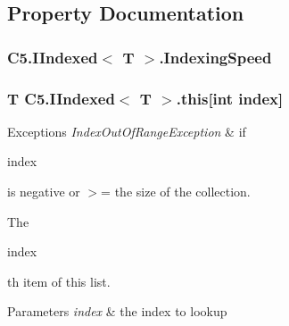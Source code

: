 \subsection{Property Documentation}
\hypertarget{interface_c5_1_1_i_indexed_a32f84a737f8725bc93ff50b44539a413}{}
\subsubsection[{Indexing\+Speed}]{ {\bf C5.\+I\+Indexed}$<$ T $>$.Indexing\+Speed\hspace{0.3cm}{\ttfamily [get]}}\label{interface_c5_1_1_i_indexed_a32f84a737f8725bc93ff50b44539a413}




\hypertarget{interface_c5_1_1_i_indexed_a1e716eed0c1bc5b1d30e456fab869dc6}{}
\subsubsection[{this[int index]}]{\setlength{\rightskip}{0pt plus 5cm}T {\bf C5.\+I\+Indexed}$<$ T $>$.this\mbox{[}int index\mbox{]}\hspace{0.3cm}{\ttfamily [get]}}\label{interface_c5_1_1_i_indexed_a1e716eed0c1bc5b1d30e456fab869dc6}





\begin{DoxyExceptions}{Exceptions}
{\em Index\+Out\+Of\+Range\+Exception} & if 
\begin{DoxyCode}
index
\end{DoxyCode}
 is negative or $>$= the size of the collection.\\
\hline
\end{DoxyExceptions}


The 
\begin{DoxyCode}
index
\end{DoxyCode}
\textquotesingle{}th item of this list.


\begin{DoxyParams}{Parameters}
{\em index} & the index to lookup\\
\hline
\end{DoxyParams}
\hypertarget{interface_c5_1_1_i_indexed_a7d2ebaba4aefbc5240fb95893596337a}{}
